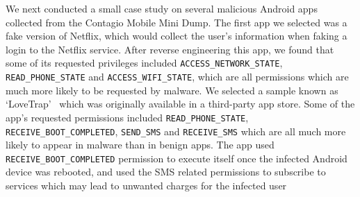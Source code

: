 \documentclass{sig-alternate}
\begin{document}
We next conducted a small case study on several malicious Android apps collected from the Contagio Mobile Mini Dump. The first app we selected was a fake version of Netflix, which would collect the user's information when faking a login to the Netflix service. After reverse engineering this app, we found that some of its requested privileges included \texttt{ACCESS\_NETWORK\_STATE}, \texttt{READ\_PHONE\_STATE} and \texttt{ACCESS\_WIFI\_STATE}, which are all permissions which are much more likely to be requested by malware. We selected a sample known as `LoveTrap'~\cite{LoveTrap_url1} which was originally available in a third-party app store. Some of the app's requested permissions included \texttt{READ\_PHONE\_STATE}, \newline \texttt{RECEIVE\_BOOT\_COMPLETED}, \texttt{SEND\_SMS} and \texttt{RECEIVE\_SMS} which are all much more likely to appear in malware than in benign apps. The app used \texttt{RECEIVE\_BOOT\_COMPLETED} permission to execute itself once the infected Android device was rebooted, and used the SMS related permissions to subscribe to services which may lead to unwanted charges for the infected user




\end{document}
